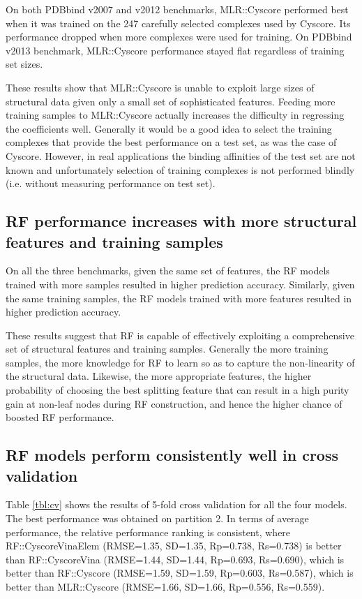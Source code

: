 \documentclass[linenumbers]{bmcart}
\begin{document}
On both PDBbind v2007 and v2012 benchmarks, MLR::Cyscore performed best when it was trained on the 247 carefully selected complexes used by Cyscore. Its performance dropped when more complexes were used for training. On PDBbind v2013 benchmark, MLR::Cyscore performance stayed flat regardless of training set sizes.

These results show that MLR::Cyscore is unable to exploit large sizes of structural data given only a small set of sophisticated features. Feeding more training samples to MLR::Cyscore actually increases the difficulty in regressing the coefficients well. Generally it would be a good idea to select the training complexes that provide the best performance on a test set, as was the case of Cyscore. However, in real applications the binding affinities of the test set are not known and unfortunately selection of training complexes is not performed blindly (i.e. without measuring performance on test set).

\subsection*{RF performance increases with more structural features and training samples}

On all the three benchmarks, given the same set of features, the RF models trained with more samples resulted in higher prediction accuracy. Similarly, given the same training samples, the RF models trained with more features resulted in higher prediction accuracy.

These results suggest that RF is capable of effectively exploiting a comprehensive set of structural features and training samples. Generally the more training samples, the more knowledge for RF to learn so as to capture the non-linearity of the structural data. Likewise, the more appropriate features, the higher probability of choosing the best splitting feature that can result in a high purity gain at non-leaf nodes during RF construction, and hence the higher chance of boosted RF performance.

\subsection*{RF models perform consistently well in cross validation}

Table \ref{tbl:cv} shows the results of 5-fold cross validation for all the four models. The best performance was obtained on partition 2. In terms of average performance, the relative performance ranking is consistent, where RF::CyscoreVinaElem (RMSE=1.35, SD=1.35, Rp=0.738, Rs=0.738) is better than RF::CyscoreVina (RMSE=1.44, SD=1.44, Rp=0.693, Rs=0.690), which is better than RF::Cyscore (RMSE=1.59, SD=1.59, Rp=0.603, Rs=0.587), which is better than MLR::Cyscore (RMSE=1.66, SD=1.66, Rp=0.556, Rs=0.559).
\end{document}
